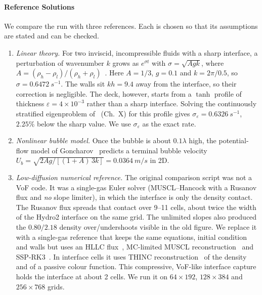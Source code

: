 \paragraph{Reference Solutions}
We compare the run with three references. Each is chosen so that its assumptions are stated and can be checked.
\begin{enumerate}
    \item \emph{Linear theory.} For two inviscid, incompressible fluids with a sharp interface, a perturbation of wavenumber $k$ grows as $e^{\sigma t}$ with $\sigma = \sqrt{A g k}$, where $A = (\rho_h - \rho_l)/(\rho_h + \rho_l)$~\cite{chandrasekhar1961hydrodynamic}. Here $A = 1/3$, $g = 0.1$ and $k = 2\pi/0.5$, so $\sigma = 0.6472~\si{s^{-1}}$. The walls sit $kh = 9.4$ away from the interface, so their correction is negligible. The deck, however, starts from a $\tanh$ profile of thickness $\varepsilon = 4\times10^{-3}$ rather than a sharp interface. Solving the continuously stratified eigenproblem of~\cite{chandrasekhar1961hydrodynamic} (Ch.~X) for this profile gives $\sigma_\varepsilon = 0.6326~\si{s^{-1}}$, $2.25\%$ below the sharp value. We use $\sigma_\varepsilon$ as the exact rate.
    \item \emph{Nonlinear bubble model.} Once the bubble is about $0.1\lambda$ high, the potential-flow model of Goncharov~\cite{goncharov2002analytical} predicts a terminal bubble velocity $U_b = \sqrt{2Ag/[(1+A)\,3k]} = 0.0364~\si{m/s}$ in 2D.
    \item \emph{Low-diffusion numerical reference.} The original comparison script was not a VoF code. It was a single-gas Euler solver (MUSCL--Hancock with a Rusanov flux and \emph{no} slope limiter), in which the interface is only the density contact. The Rusanov flux spreads that contact over 9--11 cells, about twice the width of the Hydro2 interface on the same grid. The unlimited slopes also produced the $0.80/2.18$ density over/undershoots visible in the old figure. We replace it with a single-gas reference that keeps the same equations, initial condition and walls but uses an HLLC flux~\cite{toro1994restoration}, MC-limited MUSCL reconstruction~\cite{vanleer1977towards4} and SSP-RK3~\cite{shu1988efficient}. In interface cells it uses THINC reconstruction~\cite{xiao2005simple} of the density and of a passive colour function. This compressive, VoF-like interface capture holds the interface at about 2 cells. We run it on $64\times192$, $128\times384$ and $256\times768$ grids.
\end{enumerate}

